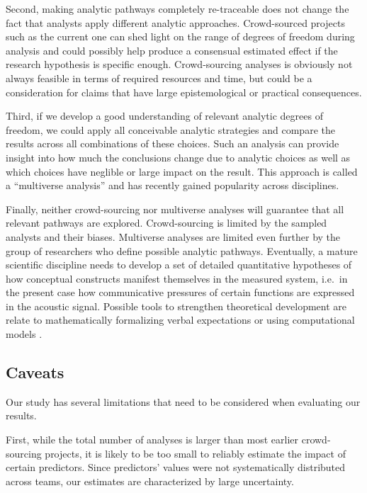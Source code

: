 \documentclass[Review,times,sageh]{sagej}
\begin{document}
Second, making analytic pathways completely re-traceable does not change the fact that analysts apply different analytic approaches.
Crowd-sourced projects such as the current one can shed light on the range of degrees of freedom during analysis and could possibly help produce a consensual estimated effect if the research hypothesis is specific enough.
Crowd-sourcing analyses is obviously not always feasible in terms of required resources and time, but could be a consideration for claims that have large epistemological or practical consequences.

Third, if we develop a good understanding of relevant analytic degrees of freedom, we could apply all conceivable analytic strategies and compare the results across all combinations of these choices.
Such an analysis can provide insight into how much the conclusions change due to analytic choices as well as which choices have neglible or large impact on the result.
This approach is called a ``multiverse analysis'' \citep[e.g,][]{steegen2016increasing, harder2020multiverse} and has recently gained popularity across disciplines.

Finally, neither crowd-sourcing nor multiverse analyses will guarantee that all relevant pathways are explored.
Crowd-sourcing is limited by the sampled analysts and their biases.
Multiverse analyses are limited even further by the group of researchers who define possible analytic pathways.
Eventually, a mature scientific discipline needs to develop a set of detailed quantitative hypotheses of how conceptual constructs manifest themselves in the measured system, i.e.~in the present case how communicative pressures of certain functions are expressed in the acoustic signal.
Possible tools to strengthen theoretical development are relate to mathematically formalizing verbal expectations or using computational models \citep[e.g.,][]{van2020formalizing, guest2021computational, scheel2021hypothesis, devezer2021case}.

\hypertarget{caveats}{%
\subsection{Caveats}\label{caveats}}

Our study has several limitations that need to be considered when evaluating our results.

First, while the total number of analyses is larger than most earlier crowd-sourcing projects, it is likely to be too small to reliably estimate the impact of certain predictors.
Since predictors' values were not systematically distributed across teams, our estimates are characterized by large uncertainty.
\end{document}
